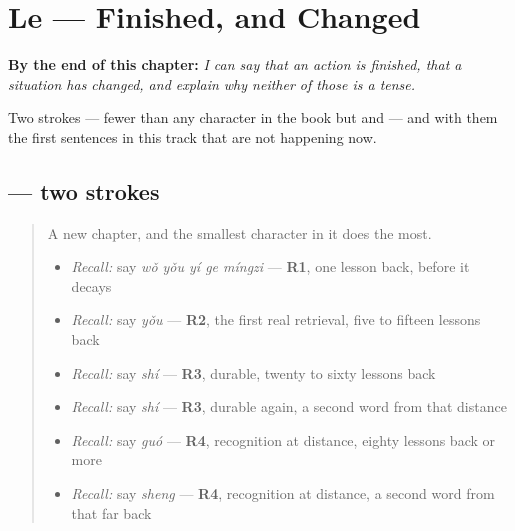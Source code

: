 
\chapter{Le — Finished, and Changed}
\label{ch:zh-le}

\begin{chapteropening}
\textbf{By the end of this chapter:} \emph{I can say that an action is finished, that a situation has changed, and explain why neither of those is a tense.}

Two strokes — fewer than any character in the book but  and  — and with them the first sentences in this track that are not happening now.
\end{chapteropening}

\section[\texorpdfstring{\zh{了} (le)}{了 (le)}]{ — two strokes}

\label{lesson:ZH-W25-le}



\begin{quote}
A new chapter, and the smallest character in it does the most.

\begin{itemize}
\raggedright
  \item \emph{Recall:} say \emph{wǒ yǒu yí ge míngzi} — \textbf{R1}, one lesson back, before it decays
  \item \emph{Recall:} say \emph{yǒu} — \textbf{R2}, the first real retrieval, five to fifteen lessons back
  \item \emph{Recall:} say \emph{shí} — \textbf{R3}, durable, twenty to sixty lessons back
  \item \emph{Recall:} say \emph{shí} — \textbf{R3}, durable again, a second word from that distance
  \item \emph{Recall:} say \emph{guó} — \textbf{R4}, recognition at distance, eighty lessons back or more
  \item \emph{Recall:} say \emph{sheng} — \textbf{R4}, recognition at distance, a second word from that far back
\end{itemize}
\end{quote}

